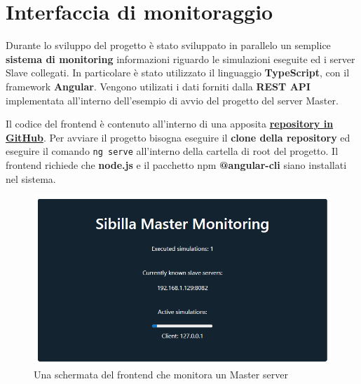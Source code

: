 \section{Interfaccia di monitoraggio}
Durante lo sviluppo del progetto è stato sviluppato in parallelo un semplice \textbf{sistema di monitoring} informazioni riguardo le simulazioni eseguite ed i server Slave collegati. In particolare è stato utilizzato il linguaggio \textbf{TypeScript}, con il framework \textbf{Angular}. Vengono utilizati i dati forniti dalla \textbf{REST API} implementata all'interno dell'esempio di avvio del progetto del server Master.

Il codice del frontend è contenuto all'interno di una apposita \href{https://github.com/ZamponiMarco/sibilla-frontend}{\textbf{repository in GitHub}}. Per avviare il progetto bisogna eseguire il \textbf{clone della repository} ed eseguire il comando \texttt{ng serve} all'interno della cartella di root del progetto. Il frontend richiede che \textbf{node.js} e il pacchetto npm \textbf{@angular-cli} siano installati nel sistema.

\begin{figure}[H]
    \includegraphics[width=\linewidth]{images/monitoring_frontend.PNG}
    \captionsetup{justification=centering}
    \caption{Una schermata del frontend che monitora un Master server}
\end{figure}
